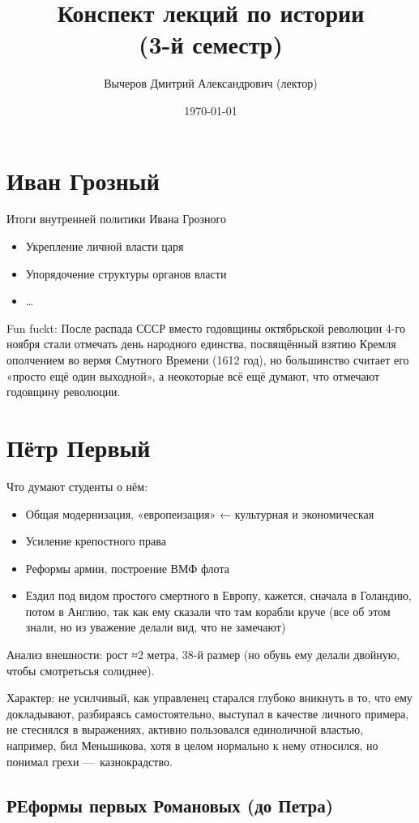 \documentclass[12pt, a4paper]{article}
\title{Конспект лекций по истории \\(3-й семестр)}
\author{
  \vova
  \and
  {Вычеров Дмитрий Александрович (лектор)}
}
\date{\today}
\begin{document}
  \tittoc


\section{Иван Грозный}

Итоги внутренней политики Ивана Грозного

\begin{itemize}
    \item Укрепление личной власти  царя
    \item Упорядочение структуры органов власти
    \item …
\end{itemize}

Fun fuckt: После распада СССР вместо годовщины октябрьской революции 4-го ноября стали отмечать день народного единства, 
посвящённый взятию Кремля ополчением во вермя Смутного Времени (1612 год), но большинство считает его «просто ещё один выходной», 
а неокоторые всё ещё думают, что отмечают годовщину революции.



\section{Пётр Первый}

Что думают студенты о нём:
\begin{itemize}
    \item Общая модернизация, «европеизация» ← культурная и экономическая
    \item Усиление крепостного права
    \item Реформы армии, построение ВМФ флота
    \item Ездил под видом простого смертного в Европу, кажется, сначала в Голандию, потом в Англию, 
    так как ему сказали что там корабли круче (все об этом знали, но из уважение делали вид, что не замечают)
\end{itemize}

Анализ внешности: рост ≈2 метра, 38-й размер (но обувь ему делали двойную, чтобы смотретьсья солиднее).

Характер: не усилчивый, как управленец старался глубоко вникнуть в то, что ему докладывают, разбираясь самостоятельно, 
выступал в качестве личного примера, не стеснялся в выражениях, 
активно пользовался единоличной властью, например, бил Меньшикова, хотя в целом нормально к нему относился, но понимал грехи — казнокрадство.


\subsection{РЕформы первых Романовых (до Петра)}
\end{document}
